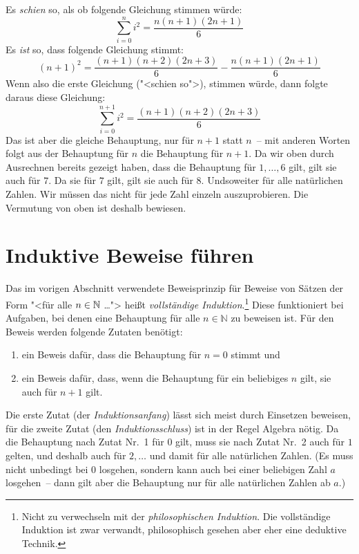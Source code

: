 Es \emph{schien} so, als ob folgende Gleichung stimmen würde:
%
\begin{displaymath}
  \sum_{i=0}^n i^2 = \dfrac{n(n+1)(2n+1)}{6}
\end{displaymath}
%
Es \emph{ist} so, dass folgende Gleichung stimmt:
%
\[ (n+1)^2 = \dfrac{(n+1)(n+2)(2n+3)}{6} - \dfrac{n(n+1)(2n+1)}{6}\]
%
Wenn also die erste Gleichung ("<schien so">), stimmen würde, dann folgte
daraus diese Gleichung:
%
\begin{displaymath}
  \sum_{i=0}^{n+1} i^2 = \dfrac{(n+1)(n+2)(2n+3)}{6}
\end{displaymath}
%
Das ist aber die gleiche Behauptung, nur für $n+1$ statt $n$~-- mit
anderen Worten folgt aus der Behauptung für $n$ die Behauptung für
$n+1$.  Da wir oben durch Ausrechnen bereits gezeigt haben, dass die
Behauptung für $1,\ldots,6$ gilt, gilt sie auch für $7$.  Da sie für
$7$ gilt, gilt sie auch für $8$.  Undsoweiter für alle natürlichen
Zahlen.  Wir müssen das nicht für jede Zahl einzeln auszuprobieren.  Die Vermutung
von oben ist deshalb bewiesen.

\section{Induktive Beweise führen}
\label{sec:nat-induction-ka}
\label{page:mathematical-induction}
Das im vorigen Abschnitt verwendete Beweisprinzip für Beweise 
von Sätzen der Form "<für alle $n\in\mathbb{N}$ \ldots">
heißt
\textit{vollständige Induktion}.\footnote{Nicht zu
verwechseln mit der \textit{philosophischen Induktion}.  Die
vollständige Induktion ist zwar verwandt, philosophisch gesehen aber
eher eine deduktive Technik.}  Diese
funktioniert bei Aufgaben, bei denen eine Behauptung für alle
$n\in\mathbb{N}$ zu beweisen ist.  Für den Beweis werden folgende
Zutaten benötigt:
%
\begin{enumerate}
\item ein Beweis dafür, dass die Behauptung für $n=0$ stimmt und
\item ein Beweis dafür, dass, wenn die Behauptung für ein beliebiges
  $n$ gilt, sie auch für $n+1$ gilt.
\end{enumerate}
%
Die erste Zutat (der
\textit{Induktionsanfang}) lässt sich meist
durch Einsetzen beweisen, für die zweite Zutat (den
\textit{Induktionsschluss}) ist in der Regel Algebra
nötig.  Da die Behauptung nach Zutat Nr.~1 für $0$ gilt, muss sie nach
Zutat Nr.~2 auch für $1$ gelten, und deshalb auch für $2,\ldots$ und
damit für alle natürlichen Zahlen.  (Es muss nicht unbedingt bei $0$
losgehen, sondern kann auch bei einer beliebigen Zahl $a$ losgehen~--
dann gilt aber die Behauptung nur für alle natürlichen Zahlen ab $a$.)

